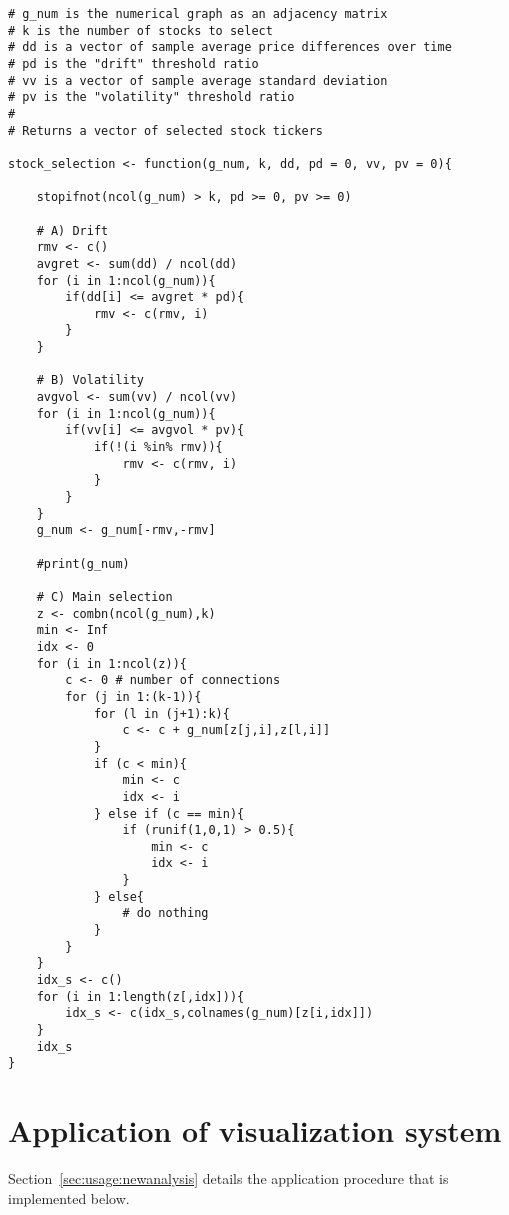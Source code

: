 {
\begin{lstlisting}
# g_num is the numerical graph as an adjacency matrix
# k is the number of stocks to select
# dd is a vector of sample average price differences over time
# pd is the "drift" threshold ratio
# vv is a vector of sample average standard deviation
# pv is the "volatility" threshold ratio
#
# Returns a vector of selected stock tickers

stock_selection <- function(g_num, k, dd, pd = 0, vv, pv = 0){

	stopifnot(ncol(g_num) > k, pd >= 0, pv >= 0)
	
	# A) Drift
	rmv <- c()
	avgret <- sum(dd) / ncol(dd)
	for (i in 1:ncol(g_num)){
		if(dd[i] <= avgret * pd){
			rmv <- c(rmv, i)
		}
	}
	
	# B) Volatility
	avgvol <- sum(vv) / ncol(vv)
	for (i in 1:ncol(g_num)){
		if(vv[i] <= avgvol * pv){
			if(!(i %in% rmv)){
				rmv <- c(rmv, i)
			}
		}
	}
	g_num <- g_num[-rmv,-rmv]
	
	#print(g_num)
	
	# C) Main selection
	z <- combn(ncol(g_num),k)
	min <- Inf
	idx <- 0 
	for (i in 1:ncol(z)){
		c <- 0 # number of connections
		for (j in 1:(k-1)){
			for (l in (j+1):k){
				c <- c + g_num[z[j,i],z[l,i]]
			}
			if (c < min){
				min <- c
				idx <- i
			} else if (c == min){
				if (runif(1,0,1) > 0.5){
					min <- c
					idx <- i
				}
			} else{
				# do nothing
			}
		}
	}
	idx_s <- c()
	for (i in 1:length(z[,idx])){
		idx_s <- c(idx_s,colnames(g_num)[z[i,idx]])
	}
	idx_s
}
\end{lstlisting}
}










\section{Application of visualization system}
\label{sec:appendicies:usage:newanalysis}

Section~\ref{sec:usage:newanalysis} details the application procedure that is 
implemented below.

